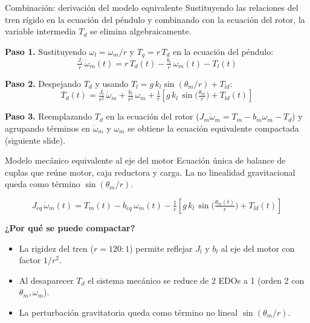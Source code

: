 \documentclass[aspectratio=169,t]{beamer}
\begin{document}
\begin{frame}{Combinación: derivación del modelo equivalente}
{\small\color{uncGray}Sustituyendo las relaciones del tren rígido en la ecuación del péndulo y combinando con la ecuación del rotor, la variable intermedia $T_d$ se elimina algebraicamente.}\par
\vspace{2mm}

\textbf{Paso 1.} Sustituyendo $\omega_l = \omega_m/r$ y $T_q = r\,T_d$ en la ecuación del péndulo:
\begin{equation*}
\tfrac{J_l}{r}\,\dot{\omega}_m(t) = r\,T_d(t) - \tfrac{b_l}{r}\,\omega_m(t) - T_l(t)
\end{equation*}

\textbf{Paso 2.} Despejando $T_d$ y usando $T_l = g\,k_l\sin(\theta_m/r)+T_{ld}$:
\begin{equation*}
T_d(t) = \tfrac{J_l}{r^2}\,\dot{\omega}_m + \tfrac{b_l}{r^2}\,\omega_m + \tfrac{1}{r}\!\left[g\,k_l\,\sin\!\big(\tfrac{\theta_m}{r}\big) + T_{ld}(t)\right]
\end{equation*}

\textbf{Paso 3.} Reemplazando $T_d$ en la ecuación del rotor ($J_m\dot{\omega}_m=T_m-b_m\omega_m-T_d$) y agrupando términos en $\dot{\omega}_m$ y $\omega_m$ se obtiene la ecuación equivalente compactada (siguiente slide).
\end{frame}

\begin{frame}{Modelo mecánico equivalente al eje del motor}
{\small\color{uncGray}Ecuación única de balance de cuplas que reúne motor, caja reductora y carga. La no linealidad gravitacional queda como término $\sin(\theta_m/r)$.}\par
\vspace{8mm}

\begin{equation*}
\boxed{\;\;
J_{eq}\,\dot{\omega}_m(t) = T_m(t) - b_{eq}\,\omega_m(t) - \tfrac{1}{r}\!\left[g\,k_l\,\sin\!\big(\tfrac{\theta_m(t)}{r}\big) + T_{ld}(t)\right]
\;\;}
\end{equation*}

\vspace{8mm}
\textbf{¿Por qué se puede compactar?}
\begin{itemize}
\item La rigidez del tren ($r=120{:}1$) permite reflejar $J_l$ y $b_l$ al eje del motor con factor $1/r^2$.
\item Al desaparecer $T_d$ el sistema mecánico se reduce de 2 EDOs a 1 (orden 2 con $\theta_m,\omega_m$).
\item La perturbación gravitatoria queda como término no lineal $\sin(\theta_m/r)$.
\end{itemize}
\end{frame}
\end{document}
